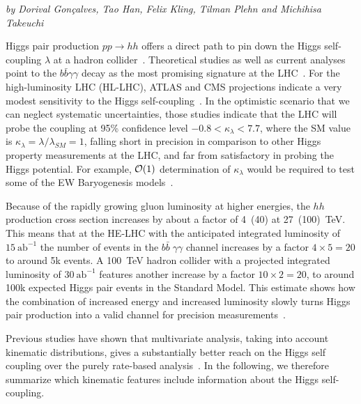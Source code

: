 \begin{center}
\textit{by Dorival Gon\c{c}alves, Tao Han, Felix Kling, Tilman Plehn and Michihisa Takeuchi}
\end{center}

Higgs pair production $pp\rightarrow hh$ offers a direct path to pin
down the Higgs self-coupling $\lambda$ at a hadron collider~\cite{hh-orig,hh-early}.  
Theoretical studies as well as current analyses
point to the $b\bar{b}\gamma\gamma$ decay as the most promising
signature at the LHC~\cite{current-gamma}. 
For the high-luminosity LHC (HL-LHC),
ATLAS and CMS projections indicate a very modest sensitivity to the
Higgs self-coupling~\cite{hl-lhc}. 
In the optimistic scenario that we can neglect systematic
uncertainties, those studies indicate that the LHC will probe the
coupling at 95\% confidence level $-0.8 < \kappa_\lambda < 7.7$, where the SM value is $\kappa_\lambda = \lambda/\lambda_{SM}=1$, 
falling short in precision in comparison to other Higgs 
property measurements at the LHC, and far from satisfactory in probing the
Higgs potential. For example, ${\cal O}(1)$ determination of $\kappa_\lambda$ would be required to 
test some of the EW Baryogenesis models~\cite{ew_phase}.

Because of the rapidly growing gluon luminosity at higher energies,
the $hh$ production cross section increases by about a factor of
4~(40) at 27~(100)~TeV.  This means that at the HE-LHC with the
anticipated integrated luminosity of $15~\text{ab}^{-1}$ the number of events in
the $b\bar{b} \; \gamma \gamma$ channel increases by a factor $4
\times 5 = 20$ to around 5k events.  A 100~TeV hadron collider with
a projected integrated luminosity of $30~\text{ab}^{-1}$ features another
increase by a factor $10 \times 2=20$, to around 100k expected Higgs
pair events in the Standard Model.
This estimate shows how the combination of increased energy and
increased luminosity slowly turns Higgs pair production into a valid
channel for precision measurements~\cite{he-lhc-hh}. 

\label{sec:features}

Previous studies have shown that multivariate analysis, taking into 
account kinematic distributions, gives a substantially better reach 
on the Higgs self coupling over the purely rate-based 
analysis~\cite{he-lhc-hh,madmax-hh,vernon,martin}. In the following, we therefore 
summarize which kinematic features include information about the 
Higgs self-coupling. 

